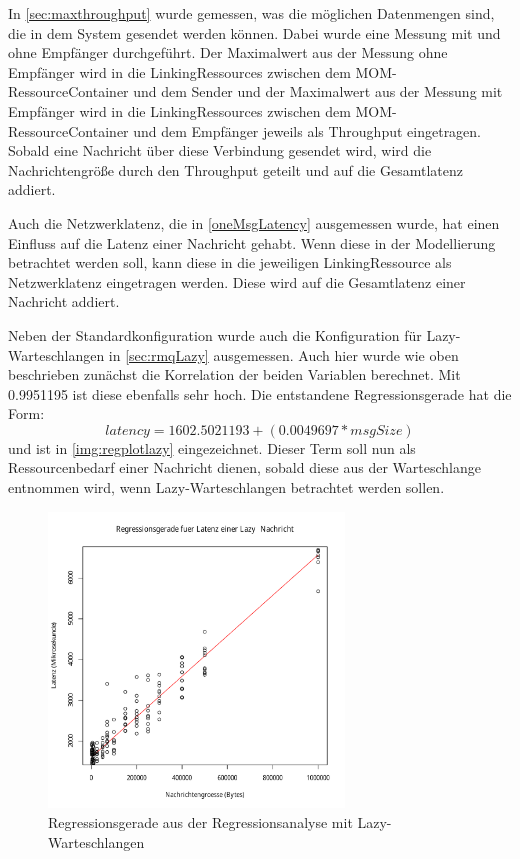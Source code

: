 \par

In \autoref{sec:maxthroughput} wurde gemessen, was die möglichen Datenmengen sind, die in dem System gesendet werden können. Dabei wurde eine Messung mit und ohne Empfänger durchgeführt. Der Maximalwert aus der Messung ohne Empfänger wird in die LinkingRessources zwischen dem MOM-RessourceContainer und dem Sender und der Maximalwert aus der Messung mit Empfänger wird in die LinkingRessources zwischen dem MOM-RessourceContainer und dem Empfänger jeweils als Throughput eingetragen. Sobald eine Nachricht über diese Verbindung gesendet wird, wird die Nachrichtengröße durch den Throughput geteilt und auf die Gesamtlatenz addiert. \par

Auch die Netzwerklatenz, die in \autoref{oneMsgLatency} ausgemessen wurde, hat einen Einfluss auf die Latenz einer Nachricht gehabt. Wenn diese in der Modellierung betrachtet werden soll, kann diese in die jeweiligen LinkingRessource als Netzwerklatenz eingetragen werden. Diese wird auf die Gesamtlatenz einer Nachricht addiert. \par

Neben der Standardkonfiguration wurde auch die Konfiguration für Lazy-Warteschlangen in \autoref{sec:rmqLazy} ausgemessen. Auch hier wurde wie oben beschrieben zunächst die Korrelation der beiden Variablen berechnet. Mit 0.9951195 ist diese ebenfalls sehr hoch. Die entstandene Regressionsgerade hat die Form: \[latency = 1602.5021193 + (0.0049697 * msgSize)\] und ist in \autoref{img:regplotlazy} eingezeichnet. Dieser Term soll nun als Ressourcenbedarf einer Nachricht dienen, sobald diese aus der Warteschlange entnommen wird, wenn Lazy-Warteschlangen betrachtet werden sollen.
\begin{figure}
\center
  \includegraphics[width=0.7\textwidth]{images/modelling/oneMsgLazyRegression.pdf}
  \caption{Regressionsgerade aus der Regressionsanalyse mit Lazy-Warteschlangen}
  \label{img:regplotlazy}
\end{figure}

